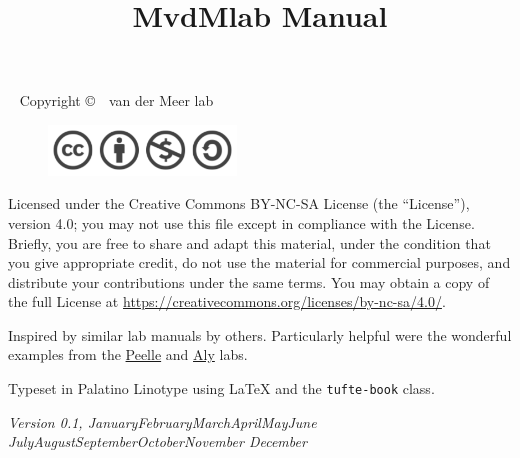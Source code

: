 \documentclass{tufte-book}
\title{MvdMlab Manual}
\newcommand{\monthyear}{%
  \ifcase\month\or January\or February\or March\or April\or May\or June\or
  July\or August\or September\or October\or November\or
  December\fi\space\number\year
}
\newcommand{\openepigraph}[2]{%
  \begin{fullwidth}
  \sffamily\large
  \begin{doublespace}
  \noindent\allcaps{#1}\\%
  \noindent\allcaps{#2}%
  \end{doublespace}
  \end{fullwidth}
}
\newcommand{\blankpage}{\newpage\hbox{}\thispagestyle{empty}\newpage}
\newcommand{\doccls}[1]{\texttt{#1}}%
\begin{document}



\maketitle

\newpage
\begin{fullwidth}
~\vfill
\thispagestyle{empty}
\setlength{\parindent}{0pt}
\setlength{\parskip}{\baselineskip}
Copyright \copyright\ \the\year\ van der Meer lab

\par{}

\begin{figure}
  \includegraphics[width=5cm]{images/license.png}
\end{figure}


\par Licensed under the Creative Commons BY-NC-SA License (the
``License''), version 4.0; you may not use this file except in
compliance with the License. Briefly, you are free to share and adapt
this material, under the condition that you give appropriate credit,
do not use the material for commercial purposes, and distribute your
contributions under the same terms. You may obtain a copy of the full
License at \url{https://creativecommons.org/licenses/by-nc-sa/4.0/}.

\par Inspired by similar lab manuals by others. Particularly helpful
were the wonderful examples from the
\href{http://jpeelle.net/peellelab_manual.pdf}{Peelle} and \href{https://github.com/alylab/labmanual}{Aly} labs.

\par Typeset in Palatino Linotype using \LaTeX{} and the
\doccls{tufte-book} class.

\par\textit{Version 0.1, \monthyear}
\end{fullwidth}
\end{document}
